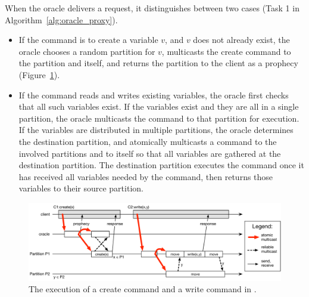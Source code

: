 When the oracle delivers a request, it distinguishes between two cases (Task 1 in Algorithm~\ref{alg:oracle_proxy}).
\begin{itemize}
\item If the command is to create a variable $v$, and $v$ does not already exist, the oracle chooses a random partition for $v$, multicasts the create command to the partition and itself, and returns the partition to the client as a prophecy (Figure~\ref{fig:oracle_repartition}).
\item If the command reads and writes existing variables, the oracle first checks that all such variables exist.
If the variables exist and they are all in a single partition, the oracle multicasts the command to that partition for execution.
If the variables are distributed in multiple partitions, the oracle determines the destination partition, and atomically multicasts a command to the involved partitions and to itself so that all variables are gathered at the destination partition.
The destination partition executes the command once it has received all variables needed by the command, then returns those variables to their source partition.

\end{itemize}





\begin{figure}
\begin{minipage}[b]{1\linewidth} %
\centering
      \includegraphics[width=0.9\linewidth]{figures/dynastar}
\end{minipage}
\caption{The execution of a create command and a write command in \dynastar.}
\label{fig:oracle_repartition}
\end{figure}

